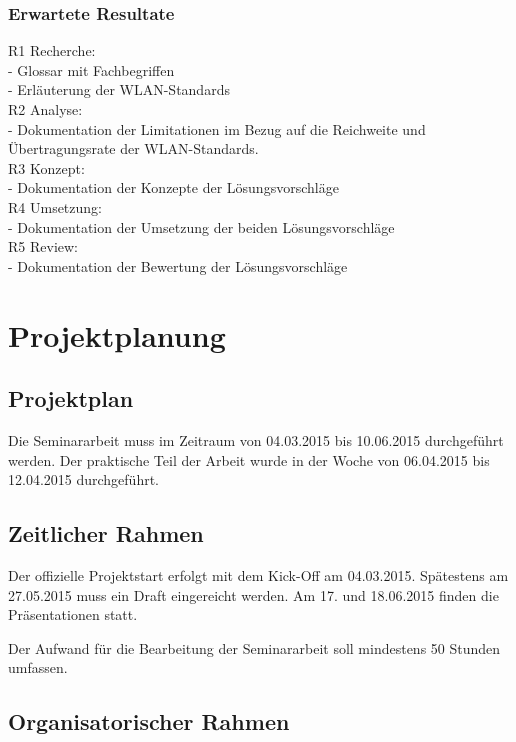 \documentclass[oneside,11pt,parskip=half,ngerman]{scrreprt}
\begin{document}
\subsection{Erwartete Resultate}\label{erwartete-resultate}

R1 Recherche:\\- Glossar mit Fachbegriffen\\- Erläuterung der
WLAN-Standards\\R2 Analyse:\\- Dokumentation der Limitationen im Bezug
auf die Reichweite und Übertragungsrate der WLAN-Standards.\\R3
Konzept:\\- Dokumentation der Konzepte der Lösungsvorschläge\\R4
Umsetzung:\\- Dokumentation der Umsetzung der beiden
Lösungsvorschläge\\R5 Review:\\- Dokumentation der Bewertung der
Lösungsvorschläge

\chapter{Projektplanung}\label{projektplanung}

\section{Projektplan}\label{projektplan}

Die Seminararbeit muss im Zeitraum von 04.03.2015 bis 10.06.2015
durchgeführt werden. Der praktische Teil der Arbeit wurde in der Woche
von 06.04.2015 bis 12.04.2015 durchgeführt.

\section{Zeitlicher Rahmen}\label{zeitlicher-rahmen}

Der offizielle Projektstart erfolgt mit dem Kick-Off am 04.03.2015.
Spätestens am 27.05.2015 muss ein Draft eingereicht werden. Am 17. und
18.06.2015 finden die Präsentationen statt.

Der Aufwand für die Bearbeitung der Seminararbeit soll mindestens 50
Stunden umfassen.

\section{Organisatorischer Rahmen}\label{organisatorischer-rahmen}
\end{document}
